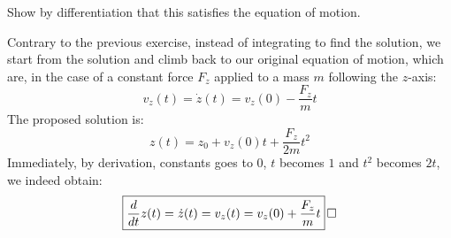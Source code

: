 \documentclass[solutions.tex]{subfiles}
\begin{document}
\maketitle
\begin{exercise}
Show by differentiation that this satisfies the equation of motion.
\end{exercise}
Contrary to the previous exercise, instead of integrating to find
the solution, we start from the solution and climb back to our original
equation of motion, which are, in the case of a constant force $F_z$
applied to a mass $m$ following the $z$-axis:
\[
	v_z(t) = \dot{z}(t) = v_z(0) - \frac{F_z}{m}t
\]
The proposed solution is:
\[
	z(t) = z_0 + v_z(0)t + \frac{F_z}{2m}t^2
\]
Immediately, by derivation, constants goes to $0$, $t$ becomes $1$ and
$t^2$ becomes $2t$, we indeed obtain:
\[
	\boxed{\frac{d}{dt}z(t) = \dot{z}(t) = v_z(t) = v_z(0) + \frac{F_z}{m}t}\qed
\]
\end{document}
